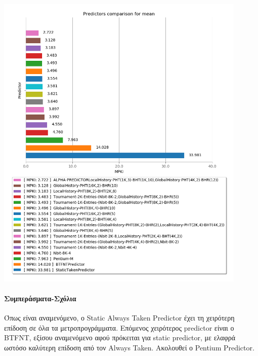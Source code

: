    \begin{minipage}{\textwidth}
      \begin{center}
         \\
         \vspace{3mm}
         \includegraphics[width=0.9\textwidth, frame]{./graphs/4-5/mean.png}
         \vspace{6mm}
      \end{center}
   \end{minipage}
\newpage
\paragraph{Συμπεράσματα-Σχόλια}
   Όπως είναι αναμενόμενο, ο Static Always Taken Predictor έχει τη χειρότερη
   επίδοση σε όλα τα μετροπρογράμματα. Επόμενος χειρότερος predictor είναι ο
   BTFNT, εξίσου αναμενόμενο αφού πρόκειται για static predictor, με ελαφρά
   ωστόσο καλύτερη επίδοση από τον Always Taken. Ακολουθεί ο Pentium Predictor. 
  
